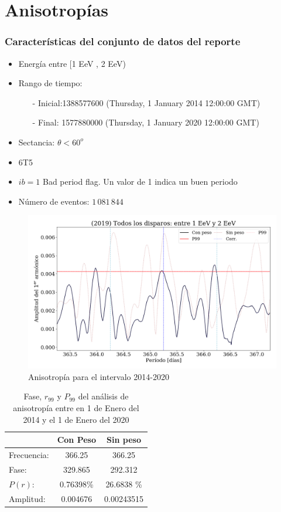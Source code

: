 \section{Anisotropías}

\subsubsection{Características del conjunto de datos del reporte}

\begin{itemize}
	\item Energía entre  [1 EeV , 2 EeV)
	\item Rango de tiempo:
	\begin{itemize}
		\item[-] Inicial:1388577600 (Thursday, 1 January 2014 12:00:00 GMT)
		\item[-] Final: 1577880000  (Thursday, 1 January 2020 12:00:00 GMT)
	\end{itemize}
	\item Sectancia:  $\theta < 60^o$
	\item 6T5
	\item $ib=1$ Bad period flag. Un valor de 1 indica un buen periodo
	\item Número de eventos: $1\,081\,844$
\end{itemize}


\begin{figure}[H]
	\centering
	\includegraphics[width=0.8\linewidth]{../report_4_12_05_2020/2019_AllTriggers_1_2_EeV_con_vs_sin_peso.png}
	\caption{Anisotropía para el intervalo 2014-2020}
	\label{fig:anis}
\end{figure}

\begin{table}[H]
\centering
\begin{tabular}{l|c|c}
				& Con Peso 	& Sin peso 		\\ \hline
Frecuencia:		& 366.25 	& 366.25 		\\
Fase:			& 329.865 	& 292.312		\\
$P(r)$:		& 0.76398\%	& 26.6838 \% 	\\
Amplitud:		& 0.004676 	& 0.00243515	\\
\end{tabular}
\caption{Fase, $r_{99}$ y $P_{99}$ del análisis de anisotropía entre en 1 de Enero del 2014 y el 1 de Enero del 2020}
\end{table}



